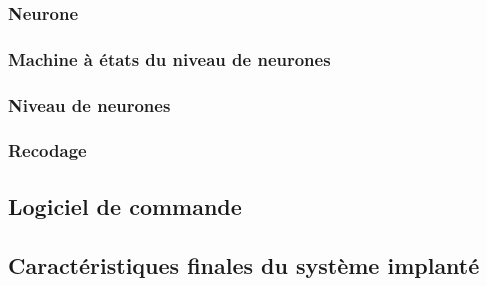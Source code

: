 \subsubsection{Neurone}
\subsubsection{Machine à états du niveau de neurones}
\subsubsection{Niveau de neurones}
\subsubsection{Recodage}

\subsection{Logiciel de commande}

\subsection{Caractéristiques finales du système implanté}
